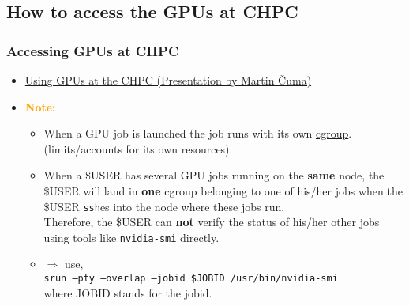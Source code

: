 \subsection{How to access the GPUs at CHPC}
\begin{frame}
   \frametitle{Accessing GPUs at CHPC}
      \begin{itemize}
	 \item \href{https://www.chpc.utah.edu/presentations/images-and-pdfs/usinggpuss24f.pdf}{Using GPUs at the CHPC (Presentation by Martin \v{C}uma)}
	 \item \textbf{\textcolor{orange}{Note:}}
            \begin{itemize}
		    \item When a GPU job is launched the job runs with its own \href{https://en.wikipedia.org/wiki/Cgroups}{cgroup}.
		     (limits/accounts for its own resources).
	     \item When a \$USER has several GPU jobs running on the \textbf{same} node,
	 	   the \$USER will land in \textbf{one} cgroup belonging to one of his/her jobs
                   when the \$USER \texttt{ssh}es into the node where these jobs run.\\
	  	   Therefore, the \$USER can \textbf{not} verify the status of his/her other jobs 
                   using tools like \texttt{nvidia-smi} directly.
	       \item $\Rightarrow$ use, \\\texttt{srun --pty --overlap --jobid \$JOBID /usr/bin/nvidia-smi} \\
		     where JOBID stands for the jobid.   
            \end{itemize}			    
      \end{itemize}		      
\end{frame}	

